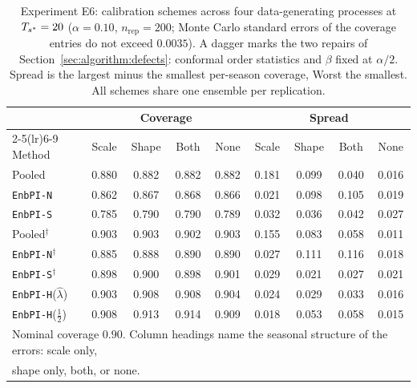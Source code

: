 \begin{table}[ht]
\centering
\small
\setlength{\tabcolsep}{4pt}
\caption{Experiment E6: calibration schemes across four
         data-generating processes at $T_{s^*} = 20$
         ($\alpha = 0.10$, $n_{\mathrm{rep}} = 200$; Monte Carlo
         standard errors of the coverage entries do not exceed
         $0.0035$).  A dagger marks the two
         repairs of Section~\ref{sec:algorithm:defects}: conformal
         order statistics and $\beta$ fixed at $\alpha/2$.  Spread
         is the largest minus the smallest per-season coverage,
         Worst the smallest.  All schemes share one ensemble per
         replication.}
\label{tab:e6_schemes}
\begin{tabular}{l cccc cccc}
\toprule
 & \multicolumn{4}{c}{Coverage} & \multicolumn{4}{c}{Spread} \\
\cmidrule(lr){2-5}\cmidrule(lr){6-9}
Method & Scale & Shape & Both & None & Scale & Shape & Both & None \\
\midrule
Pooled & 0.880 & 0.882 & 0.882 & 0.882 & 0.181 & 0.099 & 0.040 & 0.016 \\
\texttt{EnbPI-N} & 0.862 & 0.867 & 0.868 & 0.866 & 0.021 & 0.098 & 0.105 & 0.019 \\
\texttt{EnbPI-S} & 0.785 & 0.790 & 0.790 & 0.789 & 0.032 & 0.036 & 0.042 & 0.027 \\
\midrule
Pooled$^\dagger$ & 0.903 & 0.903 & 0.902 & 0.903 & 0.155 & 0.083 & 0.058 & 0.011 \\
\texttt{EnbPI-N}$^\dagger$ & 0.885 & 0.888 & 0.890 & 0.890 & 0.027 & 0.111 & 0.116 & 0.018 \\
\texttt{EnbPI-S}$^\dagger$ & 0.898 & 0.900 & 0.898 & 0.901 & 0.029 & 0.021 & 0.027 & 0.021 \\
\texttt{EnbPI-H}($\hat\lambda$) & 0.903 & 0.908 & 0.908 & 0.904 & 0.024 & 0.029 & 0.033 & 0.016 \\
\texttt{EnbPI-H}($\tfrac12$) & 0.908 & 0.913 & 0.914 & 0.909 & 0.018 & 0.053 & 0.058 & 0.015 \\
\bottomrule
\multicolumn{9}{l}{\footnotesize Nominal coverage $0.90$.  Column headings name the seasonal structure of the errors: scale only,}\\
\multicolumn{9}{l}{\footnotesize shape only, both, or none.}\\
\end{tabular}
\end{table}

